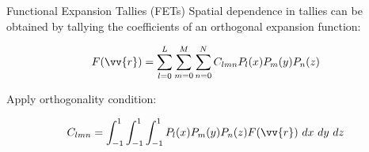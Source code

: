 \documentclass[10pt]{beamer}
\begin{document}
\begin{frame}{Functional Expansion Tallies (FETs)}
Spatial dependence in tallies can be obtained by tallying the coefficients of an orthogonal expansion function:

\begin{equation}
F(\vv{r})=\sum_{l=0}^{L}\sum_{m=0}^M\sum_{n=0}^NC_{lmn} P_l(x)P_m(y)P_n(z)
\end{equation}

Apply orthogonality condition:

\begin{equation}
C_{lmn}=\int_{-1}^1\int_{-1}^1\int_{-1}^1P_l(x)P_m(y)P_n(z)F(\vv{r})\ dx\ dy\ dz
\end{equation}


\end{frame}

\end{document}
